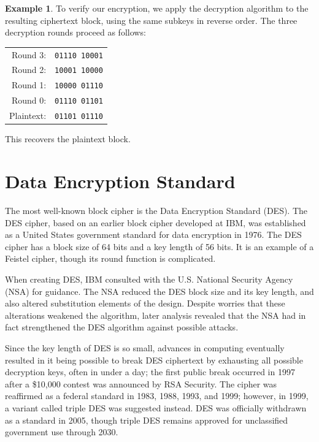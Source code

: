\documentclass{book}
\theoremstyle{plain}
\theoremstyle{definition}
\newtheorem{example}[theorem]{Example}
\newcommand{\ciphertext}[1]{\texttt{#1}} %
\begin{document}
\begin{example}
To verify our encryption, we apply the decryption algorithm to the resulting ciphertext block, using the same subkeys in reverse order. The three decryption rounds proceed as follows:

\begin{center}
\begin{tabular}{rl}
Round 3: & \ciphertext{01110 10001} \\
Round 2: & \ciphertext{10001 10000} \\
Round 1: & \ciphertext{10000 01110} \\
Round 0: & \ciphertext{01110 01101} \\
Plaintext: & \ciphertext{01101 01110}
\end{tabular}
\end{center}

This recovers the plaintext block.
\end{example}

\section{Data Encryption Standard}
The most well-known block cipher is the Data Encryption Standard (DES). The DES cipher, based on an earlier block cipher developed at IBM, was established as a United States government standard for data encryption in 1976. The DES cipher has a block size of 64 bits and a key length of 56 bits. It is an example of a Feistel cipher, though its round function is complicated.

When creating DES, IBM consulted with the U.S. National Security Agency (NSA) for guidance. The NSA reduced the DES block size and its key length, and also altered substitution elements of the design. Despite worries that these alterations weakened the algorithm, later analysis revealed that the NSA had in fact strengthened the DES algorithm against possible attacks.

Since the key length of DES is so small, advances in computing eventually resulted in it being possible to break DES ciphertext by exhausting all possible decryption keys, often in under a day; the first public break occurred in 1997 after a \$10,000 contest was announced by RSA Security. The cipher was reaffirmed as a federal standard in 1983, 1988, 1993, and 1999; however, in 1999, a variant called triple DES was suggested instead. DES was officially withdrawn as a standard in 2005, though triple DES remains approved for unclassified government use through 2030.
\end{document}
